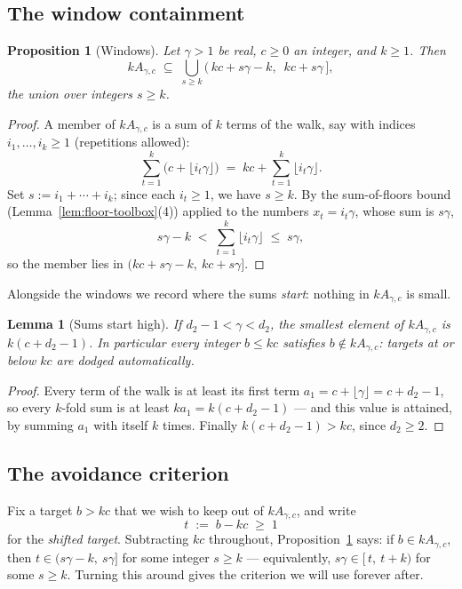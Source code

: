 \documentclass[11pt,reqno]{amsart}
\theoremstyle{plain}
\newtheorem{lemma}[theorem]{Lemma}
\newtheorem{proposition}[theorem]{Proposition}
\theoremstyle{definition}
\theoremstyle{remark}
\begin{document}
\subsection{The window containment}

\begin{proposition}[Windows]\label{prop:windows}
Let $\gamma > 1$ be real, $c \ge 0$ an integer, and $k \ge 1$. Then
\[
  k A_{\gamma,c} \;\subseteq\; \bigcup_{s \ge k}
     \big(\, kc + s\gamma - k,\ \; kc + s\gamma \,\big],
\]
the union over integers $s \ge k$.
\end{proposition}

\begin{proof}
A member of $k A_{\gamma,c}$ is a sum of $k$ terms of the walk, say with indices
$i_1, \dots, i_k \ge 1$ (repetitions allowed):
\[
  \sum_{t=1}^{k} \big( c + \lfloor i_t \gamma \rfloor \big)
  \;=\; kc + \sum_{t=1}^{k} \lfloor i_t \gamma \rfloor .
\]
Set $s := i_1 + \cdots + i_k$; since each $i_t \ge 1$, we have $s \ge k$. By the
sum-of-floors bound (Lemma~\ref{lem:floor-toolbox}(4)) applied to the numbers
$x_t = i_t \gamma$, whose sum is $s\gamma$,
\[
  s\gamma - k \;<\; \sum_{t=1}^{k} \lfloor i_t \gamma \rfloor \;\le\; s\gamma ,
\]
so the member lies in $(kc + s\gamma - k,\ kc + s\gamma]$.
\end{proof}

Alongside the windows we record where the sums \emph{start}: nothing in
$k A_{\gamma,c}$ is small.

\begin{lemma}[Sums start high]\label{lem:min-sum}
If $d_2 - 1 < \gamma < d_2$, the smallest element of $k A_{\gamma,c}$ is
$k(c + d_2 - 1)$. In particular every integer $b \le kc$ satisfies
$b \notin k A_{\gamma,c}$: targets at or below $kc$ are dodged automatically.
\end{lemma}

\begin{proof}
Every term of the walk is at least its first term $a_1 = c + \lfloor \gamma \rfloor =
c + d_2 - 1$, so every $k$-fold sum is at least $k a_1 = k(c + d_2 - 1)$ --- and this
value is attained, by summing $a_1$ with itself $k$ times. Finally
$k(c + d_2 - 1) > kc$, since $d_2 \ge 2$.
\end{proof}

\subsection{The avoidance criterion}

Fix a target $b > kc$ that we wish to keep out of $k A_{\gamma,c}$, and write
\[
  t \;:=\; b - kc \;\ge\; 1
\]
for the \emph{shifted target}. Subtracting $kc$ throughout,
Proposition~\ref{prop:windows} says: if $b \in kA_{\gamma,c}$, then
$t \in (s\gamma - k,\ s\gamma]$ for some integer $s \ge k$ --- equivalently,
$s\gamma \in [\,t,\ t + k)$ for some $s \ge k$. Turning this around gives the
criterion we will use forever after.
\end{document}
